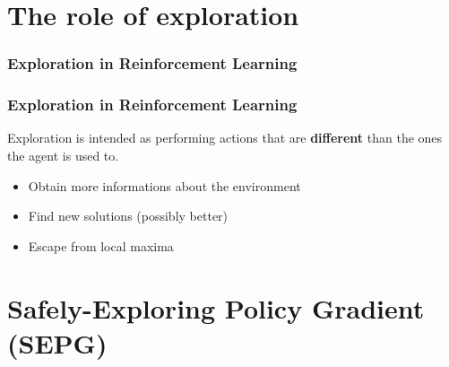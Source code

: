 \documentclass{beamer}
\begin{document}
\section{The role of exploration}

\begin{frame}
\frametitle{Exploration in Reinforcement Learning}
\centering
\end{frame}


\begin{frame}
\frametitle{Exploration in Reinforcement Learning}
Exploration is intended as performing actions that are \textbf{different} than the ones the agent is used to.

\begin{itemize}
\addtolength{\itemsep}{.2cm}
\item Obtain more informations about the environment
\item Find new solutions (possibly better)
\item Escape from local maxima
\end{itemize}

\end{frame}









\section{Safely-Exploring Policy Gradient (SEPG)}
\end{document}
